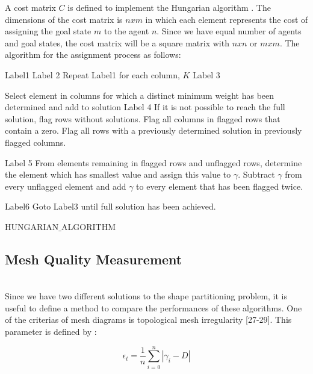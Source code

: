 A cost matrix  $C$ is defined to implement the Hungarian algorithm .  The dimensions of the cost matrix is $nxm$ in which each element represents the cost of assigning the goal state $m$ to the agent $n$.  Since we have equal number of agents and goal states, the cost matrix will be a square matrix with $nxn$ or $mxm$.  The algorithm for the assignment process as follows:
	
\begin{algorithm}[H]
Label1  \;
Label 2  \; 
{Repeat Label1 for each column, $K$}
Label 3  \; 

Select element in columns for which a distinct minimum weight has been determined and add to solution \newline
Label 4 \;
If it is not possible to reach the full solution, flag rows without solutions. Flag all columns in flagged rows that contain a zero. Flag all rows with a previously determined solution in previously flagged columns.
     
Label 5 \;
From elements remaining in flagged rows and unflagged rows, determine the element which has smallest value and assign this value to $\gamma$. Subtract $\gamma$  from every unflagged element and add  $\gamma$ to every element that has been flagged twice.
     
Label6 \;
Goto Label3 until full solution has been achieved. \newline    
\caption{HUNGARIAN$\_$ALGORITHM}
\end{algorithm}

\subsection{Mesh Quality Measurement}\hspace{0pt} \label{mesh_quality_ref}  \\
Since we have two different solutions to the shape partitioning problem, it is useful to define a method to compare the performances of these algorithms. One of the criterias of mesh diagrams is topological mesh irregularity [27-29]. This parameter is defined by : 

\begin{equation}
\epsilon _t = \frac{1}{n} \sum_{i = 0}^{n} |\gamma _i - D|
\end{equation}
	

